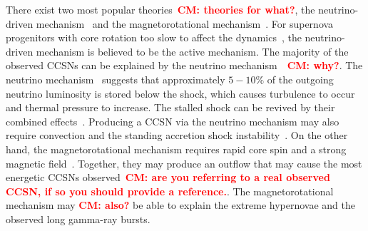 \documentclass[aps,twocolumn,showpacs,groupedaddress, nofootinbib]{revtex4}  %
\newcommand{\cm}[1]{\textbf{\textcolor{red}{CM: #1}}}
\begin{document}
%
%
There exist two most popular theories~\cm{theories for what?}, the
neutrino-driven mechanism~\cite{bethe1985revival, bethe1990supernova} and the
magnetorotational mechanism~\cite{janka2012explosion, kotake2012core,
mezzacappa2014two}. For supernova progenitors with core rotation too slow to
affect the dynamics~\cite{takiwaki2016three, summa2018rotation}, the
neutrino-driven mechanism is believed to be the active mechanism. The majority
of the observed \acp{CCSN} can be explained by the neutrino
mechanism~\cite{bruenn2016development}~\cm{why?}. The neutrino
mechanism~\cite{bethe1985revival, janka2007theory} suggests that approximately
$5-10\%$ of the outgoing neutrino luminosity is stored below the shock, which
causes turbulence to occur and thermal pressure to increase. The stalled shock
can be revived by their combined effects~\cite{couch2015role}. Producing a
\ac{CCSN} via the neutrino mechanism may also require convection and the
standing accretion shock instability~\cite{blondin2003stability}. On the other
hand, the magnetorotational mechanism requires rapid core spin and a strong
magnetic field~\cite{leblanc1970numerical, burrows2007simulations,
takiwaki2009special,
moiseenko2006magnetorotational,mosta2014magnetorotational}. Together, they may
produce an outflow that may cause the most energetic \acp{CCSN}
observed~\cm{are you referring to a real observed CCSN, if so you should
provide a reference.}. The magnetorotational mechanism may \cm{also?} be able
to explain the extreme hypernovae and the observed long gamma-ray
bursts\cite{woosley2006progenitor, yoon2005evolution, de2013rotation}.
 
\end{document}
